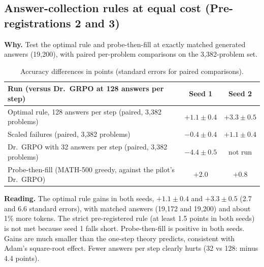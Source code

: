 \documentclass[11pt]{article}
\begin{document}
\subsection{Answer-collection rules at equal cost (Pre-registrations 2 and 3)}
\textbf{Why.} Test the optimal rule and probe-then-fill at exactly matched generated answers (19{,}200), with paired per-problem comparisons on the 3{,}382-problem set.
\begin{table}[H]
\centering\small
\begin{tabular}{@{}lcc@{}}
\toprule
\textbf{Run (versus Dr.\ GRPO at 128 answers per step)} & \textbf{Seed 1} & \textbf{Seed 2}\\
\midrule
Optimal rule, 128 answers per step (paired, 3{,}382 problems) & $+1.1\pm0.4$ & $+3.3\pm0.5$\\
Scaled failures (paired, 3{,}382 problems) & $-0.4\pm0.4$ & $+1.1\pm0.4$\\
Dr.\ GRPO with 32 answers per step (paired, 3{,}382 problems) & $-4.4\pm0.5$ & not run\\
Probe-then-fill (MATH-500 greedy, against the pilot's Dr.\ GRPO) & $+2.0$ & $+0.8$\\
\bottomrule
\end{tabular}
\caption{Accuracy differences in points (standard errors for paired comparisons).}
\end{table}
\textbf{Reading.} The optimal rule gains in both seeds, $+1.1\pm0.4$ and $+3.3\pm0.5$ (2.7 and 6.6 standard errors), with matched answers (19{,}172 and 19{,}200) and about 1\% more tokens. The strict pre-registered rule (at least 1.5 points in both seeds) is not met because seed 1 falls short. Probe-then-fill is positive in both seeds. Gains are much smaller than the one-step theory predicts, consistent with Adam's square-root effect. Fewer answers per step clearly hurts (32 vs 128: minus 4.4 points).
\end{document}
